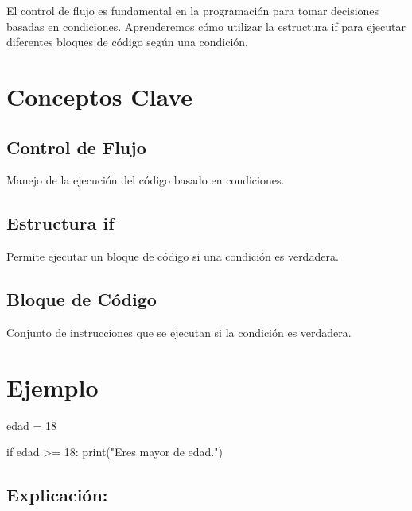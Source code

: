\documentclass[
  a4paper,
  DIV=11,
  numbers=noendperiod,
  onepage,
  openany]{scrreprt}
\newenvironment{Shaded}{\begin{snugshade}}{\end{snugshade}}
\newcommand{\BuiltInTok}[1]{\textcolor[rgb]{0.00,0.23,0.31}{#1}}
\newcommand{\ControlFlowTok}[1]{\textcolor[rgb]{0.00,0.23,0.31}{#1}}
\newcommand{\DecValTok}[1]{\textcolor[rgb]{0.68,0.00,0.00}{#1}}
\newcommand{\NormalTok}[1]{\textcolor[rgb]{0.00,0.23,0.31}{#1}}
\newcommand{\OperatorTok}[1]{\textcolor[rgb]{0.37,0.37,0.37}{#1}}
\newcommand{\StringTok}[1]{\textcolor[rgb]{0.13,0.47,0.30}{#1}}
\begin{document}
El control de flujo es fundamental en la programación para tomar
decisiones basadas en condiciones. Aprenderemos cómo utilizar la
estructura if para ejecutar diferentes bloques de código según una
condición.

\section{Conceptos Clave}\label{conceptos-clave-12}

\subsection{Control de Flujo}\label{control-de-flujo}

Manejo de la ejecución del código basado en condiciones.

\subsection{Estructura if}\label{estructura-if}

Permite ejecutar un bloque de código si una condición es verdadera.

\subsection{Bloque de Código}\label{bloque-de-cuxf3digo}

Conjunto de instrucciones que se ejecutan si la condición es verdadera.

\section{Ejemplo}\label{ejemplo-7}

\begin{Shaded}
\begin{Highlighting}[]
\NormalTok{edad }\OperatorTok{=} \DecValTok{18}

\ControlFlowTok{if}\NormalTok{ edad }\OperatorTok{\textgreater{}=} \DecValTok{18}\NormalTok{:}
    \BuiltInTok{print}\NormalTok{(}\StringTok{"Eres mayor de edad."}\NormalTok{)}
\end{Highlighting}
\end{Shaded}

\subsection{Explicación:}\label{explicaciuxf3n-16}
\end{document}
